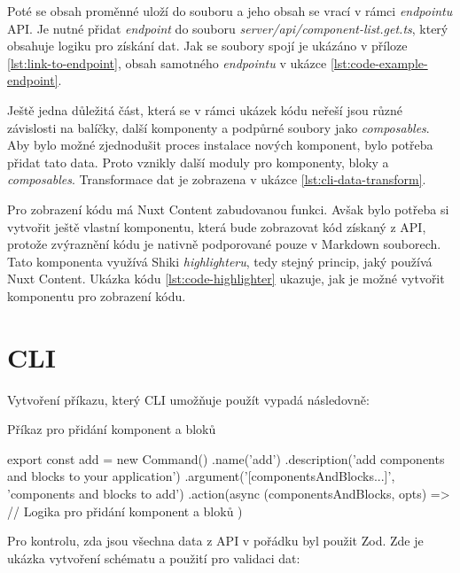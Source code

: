 Poté se obsah proměnné uloží do souboru a jeho obsah se vrací v rámci \emph{endpointu} API. Je nutné přidat \emph{endpoint} do souboru \emph{server/api/component-list.get.ts}, který obsahuje logiku pro získání dat. Jak se soubory spojí je ukázáno v příloze \ref{lst:link-to-endpoint}, obsah samotného \emph{endpointu} v ukázce \ref{lst:code-example-endpoint}.

Ještě jedna důležitá část, která se v rámci ukázek kódu neřeší jsou různé závislosti na balíčky, další komponenty a podpůrné soubory jako \emph{composables}. Aby bylo možné zjednodušit proces instalace nových komponent, bylo potřeba přidat tato data. Proto vznikly další moduly pro komponenty, bloky a \emph{composables}. Transformace dat je zobrazena v ukázce \ref{lst:cli-data-transform}.

Pro zobrazení kódu má Nuxt Content zabudovanou funkci. \cite{NuxtContentCodeHighlighting} Avšak bylo potřeba si vytvořit ještě vlastní komponentu, která bude zobrazovat kód získaný z API, protože zvýraznění kódu je nativně podporované pouze v Markdown souborech. Tato komponenta využívá Shiki \emph{highlighteru}, tedy stejný princip, jaký používá Nuxt Content. Ukázka kódu \ref{lst:code-highlighter} ukazuje, jak je možné vytvořit komponentu pro zobrazení kódu.

\section{CLI}
Vytvoření příkazu, který CLI umožňuje použít vypadá následovně:

\begin{listing}[H]
    \caption{Příkaz pro přidání komponent a bloků}
    \label{lst:cli-install}
    \begin{code}
export const add = new Command()
.name('add')
.description('add components and blocks to your application')
.argument('[componentsAndBlocks...]', 'components and blocks to add')
.action(async (componentsAndBlocks, opts) => {
    // Logika pro přidání komponent a bloků
})        
\end{code}
\end{listing}

\clearpage

Pro kontrolu, zda jsou všechna data z API v pořádku byl použit Zod. Zde je ukázka vytvoření schématu a použití pro validaci dat:

